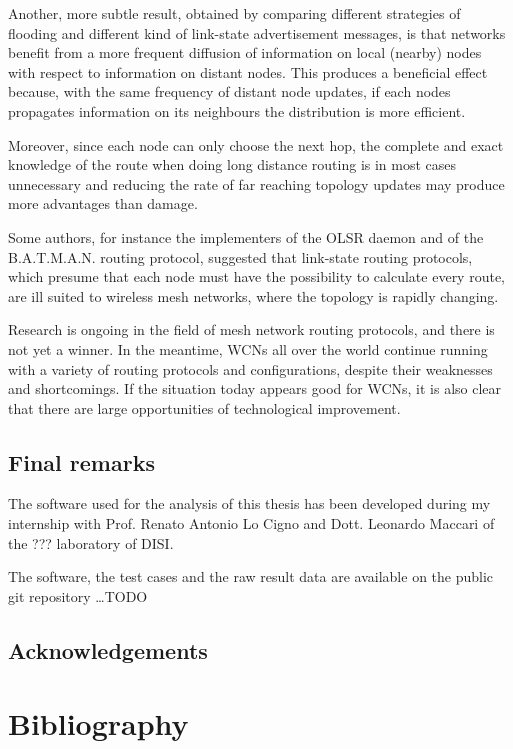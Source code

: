 \documentclass[oneside,openany]{memoir}
\begin{document}
Another, more subtle result, obtained by comparing different strategies of
flooding and different kind of link-state advertisement messages, is that
networks benefit from a more frequent diffusion of information on local (nearby)
nodes with respect to information on distant nodes. This produces a beneficial
effect because, with the same frequency of distant node updates, if each nodes
propagates information on its neighbours the distribution is more efficient.

Moreover, since each node can only choose the next hop, the complete and exact
knowledge of the route when doing long distance routing is in most cases
unnecessary and reducing the rate of far reaching topology updates may produce
more advantages than damage.

Some authors, for instance the implementers of the OLSR daemon and of the
B.A.T.M.A.N. routing protocol, suggested that link-state routing protocols,
which presume that each node must have the possibility to calculate every
route, are ill suited to wireless mesh networks, where the topology
is rapidly changing.

Research is ongoing in the field of mesh network routing protocols, and there
is not yet a winner. In the meantime, WCNs all over the world continue
running with a variety of routing protocols and configurations, despite their
weaknesses and shortcomings.
If the situation today appears good for WCNs, it is also clear that there are
large opportunities of technological improvement.

\section{Final remarks}\label{final-remarks}

The software used for the analysis of this thesis has been developed during
my internship with Prof. Renato Antonio Lo Cigno and Dott. Leonardo Maccari
of the ??? laboratory of DISI.

The software, the test cases and the raw result data are available on the public
git repository \dots TODO %

\section{Acknowledgements}\label{acknowledgements}

\chapter*{Bibliography}\label{bibliography}
\end{document}
